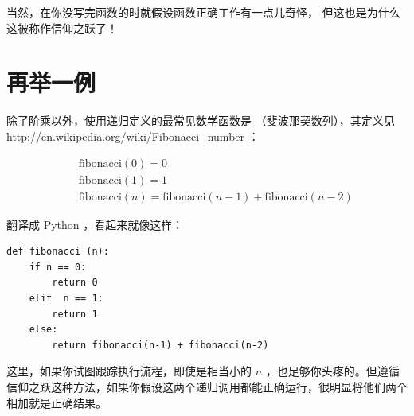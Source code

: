 
当然，在你没写完函数的时就假设函数正确工作有一点儿奇怪， 但这也是为什么这被称作信仰之跃了！


\section{再举一例}
\label{one.more.example}

  


除了阶乘以外，使用递归定义的最常见数学函数是  （斐波那契数列），其定义见 \url{http://en.wikipedia.org/wiki/Fibonacci_number} ：

%
\begin{eqnarray*}
&& \mathrm{fibonacci}(0) = 0 \\
&& \mathrm{fibonacci}(1) = 1 \\
&& \mathrm{fibonacci}(n) = \mathrm{fibonacci}(n-1) + \mathrm{fibonacci}(n-2)
\end{eqnarray*}

%

翻译成 Python ，看起来就像这样：

\begin{lstlisting}
def fibonacci (n):
    if n == 0:
        return 0
    elif  n == 1:
        return 1
    else:
        return fibonacci(n-1) + fibonacci(n-2)
\end{lstlisting}

%

这里，如果你试图跟踪执行流程，即使是相当小的 $n$ ，也足够你头疼的。但遵循信仰之跃这种方法，如果你假设这两个递归调用都能正确运行，很明显将他们两个相加就是正确结果。

